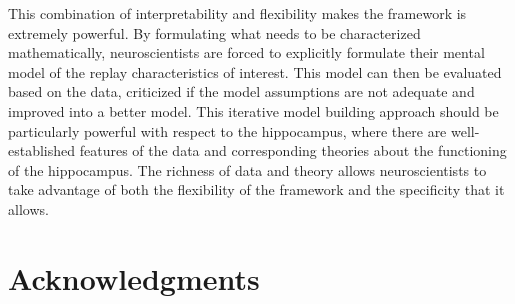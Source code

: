 \documentclass[conference]{IEEEtran}
\begin{document}
This combination of interpretability and flexibility makes the framework is extremely powerful. By formulating what needs to be characterized mathematically, neuroscientists are forced to explicitly formulate their mental model of the replay characteristics of interest. This model can then be evaluated based on the data, criticized if the model assumptions are not adequate and improved into a better model. This iterative model building approach should be particularly powerful with respect to the hippocampus, where there are well-established features of the data and corresponding theories about the functioning of the hippocampus. The richness of data and theory allows neuroscientists to take advantage of both the flexibility of the framework and the specificity that it allows.


\section*{Acknowledgments}
\printbibliography
\end{document}
